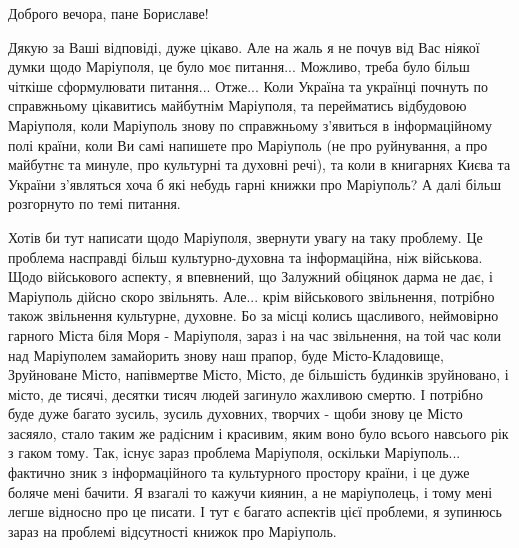 
 
 
 
 


Доброго вечора, пане Бориславе!

Дякую за Ваші відповіді, дуже цікаво. Але на жаль я не почув від Вас ніякої думки щодо Маріуполя, це було моє питання... Можливо, треба було більш чіткіше сформулювати питання... Отже... Коли Україна та українці почнуть по справжньому цікавитись майбутнім Маріуполя, та перейматись відбудовою Маріуполя, коли Маріуполь знову по справжньому з'явиться в інформаційному полі країни, коли Ви самі напишете про Маріуполь (не про руйнування, а про майбутнє та минуле, про культурні та духовні речі), та коли в книгарнях Києва та України з'являться хоча б які небудь гарні книжки про Маріуполь? А далі більш розгорнуто по темі питання.

Хотів би тут написати щодо Маріуполя, звернути увагу на таку проблему.  Це
проблема насправді більш культурно-духовна та інформаційна, ніж військова.
Щодо військового аспекту, я впевнений, що Залужний обіцянок дарма не дає, і
Маріуполь дійсно скоро звільнять. Але... крім військового звільнення, потрібно
також звільнення культурне, духовне. Бо за місці колись щасливого, неймовірно
гарного Міста біля Моря - Маріуполя, зараз і на час звільнення, на той час коли
над Маріуполем замайорить знову наш прапор, буде Місто-Кладовище, Зруйноване
Місто, напівмертве Місто, Місто, де більшість будинків зруйновано, і місто, де
тисячі, десятки тисяч людей загинуло жахливою смертю. І потрібно буде дуже
багато зусиль, зусиль духовних, творчих - щоби знову це Місто засяяло, стало
таким же радісним і красивим, яким воно було всього навсього рік з гаком тому.
Так, існує зараз проблема Маріуполя, оскільки Маріуполь... фактично зник з
інформаційного та культурного простору країни, і це дуже боляче мені бачити. Я
взагалі то кажучи киянин, а не маріуполець, і тому мені легше відносно про це
писати. І тут є багато аспектів цієї проблеми, я зупинюсь зараз на проблемі
відсутності книжок про Маріуполь.

